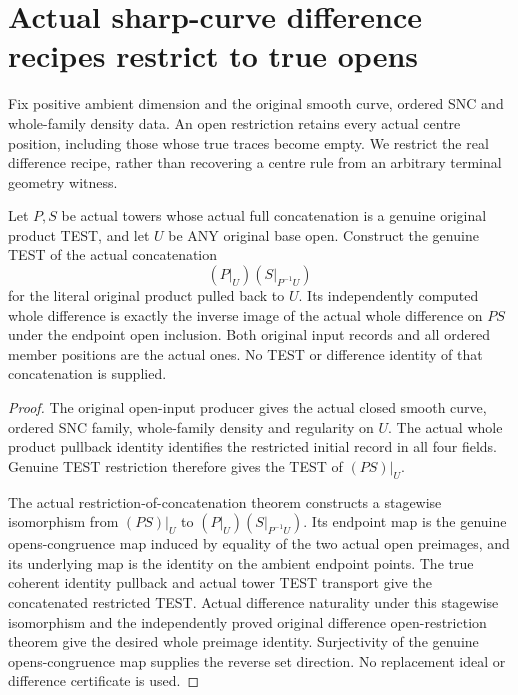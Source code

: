 \section{Actual sharp-curve difference recipes restrict to true opens}

Fix positive ambient dimension and the original smooth curve, ordered
SNC and whole-family density data. An open restriction retains every
actual centre position, including those whose true traces become empty.
We restrict the real difference recipe, rather than recovering a
centre rule from an arbitrary terminal geometry witness.

\begin{theorem}
\label{hir:sharp-original-curve-restricted-full-prefix-difference}
\leanok
Let $P,S$ be actual towers whose actual full concatenation is a genuine
original product TEST, and let $U$ be ANY original base open. Construct
the genuine TEST of the actual concatenation
\[
                 (P|_U)(S|_{P^{-1}U})
\]
for the literal original product pulled back to $U$. Its independently
computed whole difference is exactly the inverse image of the actual
whole difference on $PS$ under the endpoint open inclusion. Both
original input records and all ordered member positions are the actual
ones. No TEST or difference identity of that concatenation is supplied.
\end{theorem}
\begin{proof}
The original open-input producer gives the actual closed smooth curve,
ordered SNC family, whole-family density and regularity on $U$.
The actual whole product pullback identity identifies the restricted
initial record in all four fields. Genuine TEST restriction therefore
gives the TEST of $(PS)|_U$.

The actual restriction-of-concatenation theorem constructs a stagewise
isomorphism from $(PS)|_U$ to $(P|_U)(S|_{P^{-1}U})$. Its endpoint map
is the genuine opens-congruence map induced by equality of the two
actual open preimages, and its underlying map is the identity on the
ambient endpoint points. The true coherent identity pullback and
actual tower TEST transport give the concatenated restricted TEST.
Actual difference naturality under this stagewise isomorphism and the
independently proved original difference open-restriction theorem give
the desired whole preimage identity. Surjectivity of the genuine
opens-congruence map supplies the reverse set direction. No replacement
ideal or difference certificate is used.
\end{proof}

